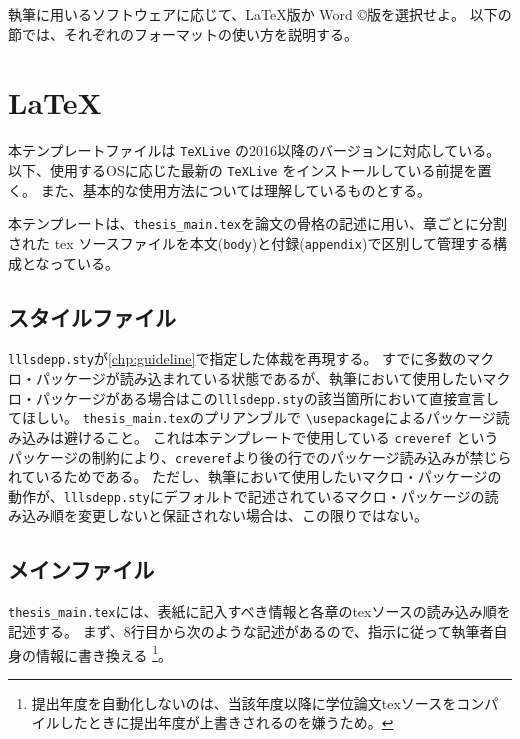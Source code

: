 		\noindent
		執筆に用いるソフトウェアに応じて、\LaTeX 版か Word \copyright 版を選択せよ。
		以下の節では、それぞれのフォーマットの使い方を説明する。

	\section{LaTeX}
		\label{sec:latex}

		本テンプレートファイルは \texttt{TeXLive} の2016以降のバージョンに対応している。
		以下、使用するOSに応じた最新の \texttt{TeXLive} をインストールしている前提を置く。
		また、基本的な使用方法については理解しているものとする。

		本テンプレートは、\texttt{thesis\_main.tex}を論文の骨格の記述に用い、章ごとに分割された tex ソースファイルを本文(\texttt{body})と付録(\texttt{appendix})で区別して管理する構成となっている。

		\subsection{スタイルファイル}
		  \label{sub:style_file}

			\texttt{lllsdepp.sty}が\cref{chp:guideline}で指定した体裁を再現する。
			すでに多数のマクロ・パッケージが読み込まれている状態であるが、執筆において使用したいマクロ・パッケージがある場合はこの\texttt{lllsdepp.sty}の該当箇所において直接宣言してほしい。
			\texttt{thesis\_main.tex}のプリアンブルで \texttt{\textbackslash usepackage}によるパッケージ読み込みは避けること。
			これは本テンプレートで使用している \texttt{creveref} というパッケージの制約により、\texttt{creveref}より後の行でのパッケージ読み込みが禁じられているためである。
			ただし、執筆において使用したいマクロ・パッケージの動作が、\texttt{lllsdepp.sty}にデフォルトで記述されているマクロ・パッケージの読み込み順を変更しないと保証されない場合は、この限りではない。



		\subsection{メインファイル}
		  \label{sub:メインファイル}

			\texttt{thesis\_main.tex}には、表紙に記入すべき情報と各章のtexソースの読み込み順を記述する。
			まず、8行目から次のような記述があるので、指示に従って執筆者自身の情報に書き換える
			\footnote{提出年度を自動化しないのは、当該年度以降に学位論文texソースをコンパイルしたときに提出年度が上書きされるのを嫌うため。}。

